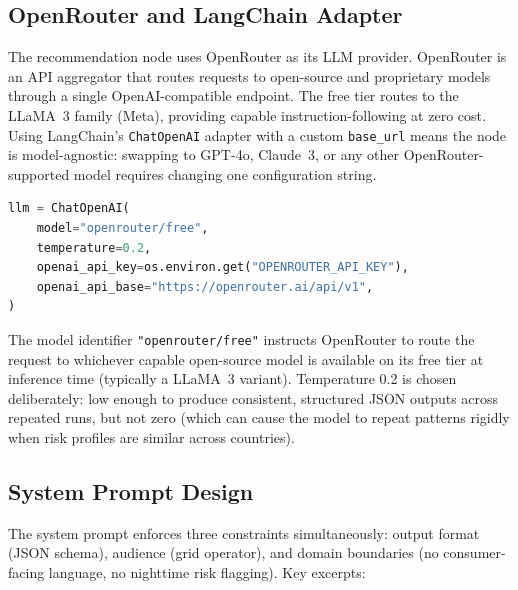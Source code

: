 \documentclass[12pt, a4paper]{article}
\begin{document}
\subsection{OpenRouter and LangChain Adapter}

The recommendation node uses OpenRouter as its LLM provider. OpenRouter is an API aggregator that routes requests to open-source and proprietary models through a single OpenAI-compatible endpoint. The free tier routes to the LLaMA~3 family (Meta), providing capable instruction-following at zero cost. Using LangChain's \texttt{ChatOpenAI} adapter with a custom \texttt{base\_url} means the node is model-agnostic: swapping to GPT-4o, Claude~3, or any other OpenRouter-supported model requires changing one configuration string.

\begin{lstlisting}[language=Python]
llm = ChatOpenAI(
    model="openrouter/free",
    temperature=0.2,
    openai_api_key=os.environ.get("OPENROUTER_API_KEY"),
    openai_api_base="https://openrouter.ai/api/v1",
)
\end{lstlisting}

The model identifier \texttt{"openrouter/free"} instructs OpenRouter to route the request to whichever capable open-source model is available on its free tier at inference time (typically a LLaMA~3 variant). Temperature 0.2 is chosen deliberately: low enough to produce consistent, structured JSON outputs across repeated runs, but not zero (which can cause the model to repeat patterns rigidly when risk profiles are similar across countries).

\subsection{System Prompt Design}

The system prompt enforces three constraints simultaneously: output format (JSON schema), audience (grid operator), and domain boundaries (no consumer-facing language, no nighttime risk flagging). Key excerpts:
\end{document}
